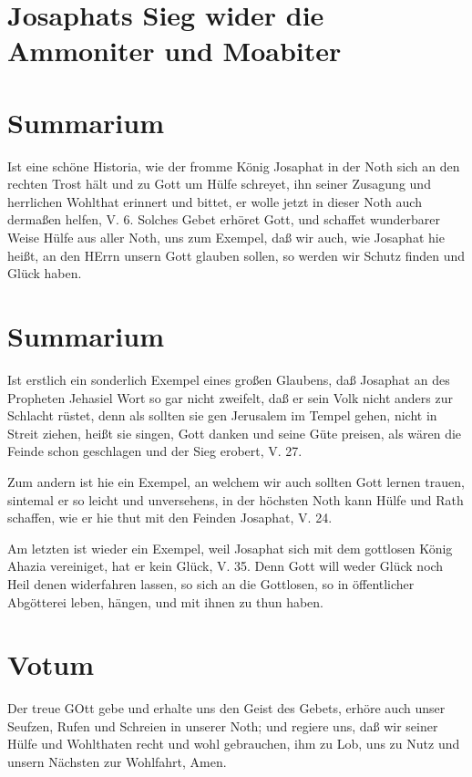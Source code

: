 \section[Josaphats Sieg wider die Ammoniter und Moabiter]{Josaphats Sieg wider die Ammoniter und Moabiter}

\section{Summarium}

Ist eine schöne Historia, wie der fromme König Josaphat in der Noth sich an den rechten Trost hält und zu Gott um Hülfe schreyet, ihn seiner Zusagung und herrlichen Wohlthat erinnert und bittet, er wolle jetzt in dieser Noth auch dermaßen helfen, V. 6. Solches Gebet erhöret Gott, und schaffet wunderbarer Weise Hülfe aus aller Noth, uns zum Exempel, daß wir auch, wie Josaphat hie heißt, an den HErrn unsern Gott glauben sollen, so werden wir Schutz finden und Glück haben.

\section{Summarium}

Ist erstlich ein sonderlich Exempel eines großen Glaubens, daß Josaphat an des Propheten Jehasiel Wort so gar nicht zweifelt, daß er sein Volk nicht anders zur Schlacht rüstet, denn als sollten sie gen Jerusalem im Tempel gehen, nicht in Streit ziehen, heißt sie singen, Gott danken und seine Güte preisen, als wären die Feinde schon geschlagen und der Sieg erobert, V. 27.

Zum andern ist hie ein Exempel, an welchem wir auch sollten Gott lernen trauen, sintemal er so leicht und unversehens, in der höchsten Noth kann Hülfe und Rath schaffen, wie er hie thut mit den Feinden Josaphat, V. 24.

Am letzten ist wieder ein Exempel, weil Josaphat sich mit dem gottlosen König Ahazia vereiniget, hat er kein Glück, V. 35. Denn Gott will weder Glück noch Heil denen widerfahren lassen, so sich an die Gottlosen, so in öffentlicher Abgötterei leben, hängen, und mit ihnen zu thun haben.

\section{Votum}

Der treue GOtt gebe und erhalte uns den Geist des Gebets, erhöre auch unser Seufzen, Rufen und Schreien in unserer Noth; und regiere uns, daß wir seiner Hülfe und Wohlthaten recht und wohl gebrauchen, ihm zu Lob, uns zu Nutz und unsern Nächsten zur Wohlfahrt, Amen.

